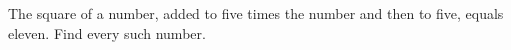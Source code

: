 The square of a number, added to five times the number and then to five, equals eleven. Find every such number.
